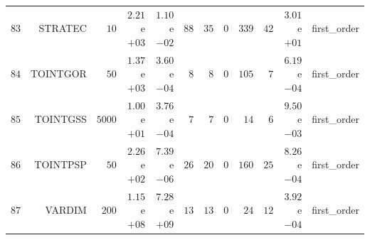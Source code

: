 \begin{longtable}{rrrrrrrrrrrr}
  \(    83\) & STRATEC & \(    10\) & \( 2.21\)e\(+03\) & \( 1.10\)e\(-02\) & \(    88\) & \(    35\) & \(     0\) & \(   339\) & \(    42\) & \( 3.01\)e\(+01\) & first\_order \\
  \(    84\) & TOINTGOR & \(    50\) & \( 1.37\)e\(+03\) & \( 3.60\)e\(-04\) & \(     8\) & \(     8\) & \(     0\) & \(   105\) & \(     7\) & \( 6.19\)e\(-04\) & first\_order \\
  \(    85\) & TOINTGSS & \(  5000\) & \( 1.00\)e\(+01\) & \( 3.76\)e\(-04\) & \(     7\) & \(     7\) & \(     0\) & \(    14\) & \(     6\) & \( 9.50\)e\(-03\) & first\_order \\
  \(    86\) & TOINTPSP & \(    50\) & \( 2.26\)e\(+02\) & \( 7.39\)e\(-06\) & \(    26\) & \(    20\) & \(     0\) & \(   160\) & \(    25\) & \( 8.26\)e\(-04\) & first\_order \\
  \(    87\) & VARDIM & \(   200\) & \( 1.15\)e\(+08\) & \( 7.28\)e\(+09\) & \(    13\) & \(    13\) & \(     0\) & \(    24\) & \(    12\) & \( 3.92\)e\(-04\) & first\_order \\\hline
\end{longtable}
